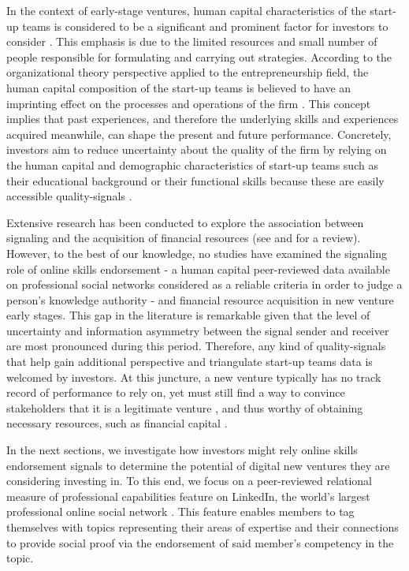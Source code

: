 \documentclass[12pt]{article}
\begin{document}
In the context of early-stage ventures, human capital characteristics of the start-up teams is considered to be a significant and prominent factor for investors to consider \citep{beckman2007early, ko2018signaling, matusik2008values}. This emphasis is due to the limited resources and small number of people responsible for formulating and carrying out strategies. According to the organizational theory perspective applied to the entrepreneurship field, the human capital composition of the start-up teams is believed to have an imprinting effect on the processes and operations of the firm \citep{packalen2007complementing}. This concept implies that past experiences, and therefore the underlying skills and experiences acquired meanwhile, can shape the present and future performance. Concretely, investors aim to reduce uncertainty about the quality of the firm by relying on the human capital and demographic characteristics of start-up teams such as their educational background or their functional skills because these are easily accessible quality-signals \citep{colombo2005founders, beckman2007early, eddleston2016you, plummer2016better}.

Extensive research has been conducted to explore the association between signaling and the acquisition of financial resources (see \citep{connelly2011signaling} and \citet{colombo2021use} for a review). However, to the best of our knowledge, no studies have examined the signaling role of online skills endorsement - a human capital peer-reviewed data available on professional social networks considered as a reliable criteria in order to judge a person’s knowledge authority \citep{rapanta2017linkedin} - and financial resource acquisition in new venture early stages. This gap in the literature is remarkable given that the level of uncertainty \citep{matusik2008values} and information asymmetry between the signal sender and receiver \citep{spence2002signaling} are most pronounced during this period. Therefore, any kind of quality-signals that help gain additional perspective and triangulate start-up teams data is welcomed by investors. At this juncture, a new venture typically has no track record of performance to rely on, yet must still find a way to convince stakeholders that it is a legitimate venture \citep{becker2015new}, and thus worthy of obtaining necessary resources, such as financial capital \citep{ko2018signaling}.

In the next sections, we investigate how investors might rely online skills endorsement signals to determine the potential of digital new ventures they are considering investing in. To this end, we focus on a peer-reviewed relational measure of professional capabilities feature on LinkedIn, the world's largest professional online social network \citep{wu2018analysis}. This feature enables members to tag themselves with topics representing their areas of expertise and their connections to provide social proof via the endorsement of said member's competency in the topic.
\end{document}
